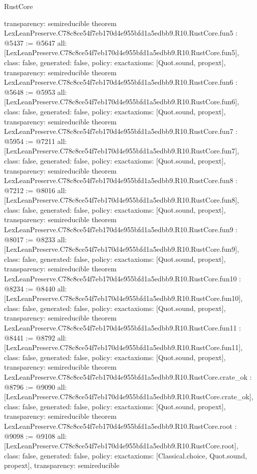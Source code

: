 \begin{lexlean}{RustCore}
\begin{coremodule}
{  transparency: semireducible
}
theorem LexLeanPreserve.C78c8ce54f7eb170d4e955bfd1a5edbb9.R10.RustCore.fun5 : @5437 := @5647 {
  all: [LexLeanPreserve.C78c8ce54f7eb170d4e955bfd1a5edbb9.R10.RustCore.fun5],
  class: false,
  generated: false,
  policy: exact{axioms: [Quot.sound, propext]},
  transparency: semireducible
}
theorem LexLeanPreserve.C78c8ce54f7eb170d4e955bfd1a5edbb9.R10.RustCore.fun6 : @5648 := @5953 {
  all: [LexLeanPreserve.C78c8ce54f7eb170d4e955bfd1a5edbb9.R10.RustCore.fun6],
  class: false,
  generated: false,
  policy: exact{axioms: [Quot.sound, propext]},
  transparency: semireducible
}
theorem LexLeanPreserve.C78c8ce54f7eb170d4e955bfd1a5edbb9.R10.RustCore.fun7 : @5954 := @7211 {
  all: [LexLeanPreserve.C78c8ce54f7eb170d4e955bfd1a5edbb9.R10.RustCore.fun7],
  class: false,
  generated: false,
  policy: exact{axioms: [Quot.sound, propext]},
  transparency: semireducible
}
theorem LexLeanPreserve.C78c8ce54f7eb170d4e955bfd1a5edbb9.R10.RustCore.fun8 : @7212 := @8016 {
  all: [LexLeanPreserve.C78c8ce54f7eb170d4e955bfd1a5edbb9.R10.RustCore.fun8],
  class: false,
  generated: false,
  policy: exact{axioms: [Quot.sound, propext]},
  transparency: semireducible
}
theorem LexLeanPreserve.C78c8ce54f7eb170d4e955bfd1a5edbb9.R10.RustCore.fun9 : @8017 := @8233 {
  all: [LexLeanPreserve.C78c8ce54f7eb170d4e955bfd1a5edbb9.R10.RustCore.fun9],
  class: false,
  generated: false,
  policy: exact{axioms: [Quot.sound, propext]},
  transparency: semireducible
}
theorem LexLeanPreserve.C78c8ce54f7eb170d4e955bfd1a5edbb9.R10.RustCore.fun10 : @8234 := @8440 {
  all: [LexLeanPreserve.C78c8ce54f7eb170d4e955bfd1a5edbb9.R10.RustCore.fun10],
  class: false,
  generated: false,
  policy: exact{axioms: [Quot.sound, propext]},
  transparency: semireducible
}
theorem LexLeanPreserve.C78c8ce54f7eb170d4e955bfd1a5edbb9.R10.RustCore.fun11 : @8441 := @8792 {
  all: [LexLeanPreserve.C78c8ce54f7eb170d4e955bfd1a5edbb9.R10.RustCore.fun11],
  class: false,
  generated: false,
  policy: exact{axioms: [Quot.sound, propext]},
  transparency: semireducible
}
theorem LexLeanPreserve.C78c8ce54f7eb170d4e955bfd1a5edbb9.R10.RustCore.crate_ok : @8796 := @9090 {
  all: [LexLeanPreserve.C78c8ce54f7eb170d4e955bfd1a5edbb9.R10.RustCore.crate_ok],
  class: false,
  generated: false,
  policy: exact{axioms: [Quot.sound, propext]},
  transparency: semireducible
}
theorem LexLeanPreserve.C78c8ce54f7eb170d4e955bfd1a5edbb9.R10.RustCore.root : @9098 := @9108 {
  all: [LexLeanPreserve.C78c8ce54f7eb170d4e955bfd1a5edbb9.R10.RustCore.root],
  class: false,
  generated: false,
  policy: exact{axioms: [Classical.choice, Quot.sound, propext]},
  transparency: semireducible
}


\end{coremodule}
\end{lexlean}
